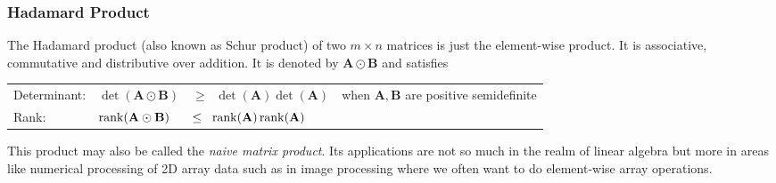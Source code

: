 






\subsubsection{Hadamard Product} The Hadamard product (also known as Schur product) of two $m \times n$ matrices is just the element-wise product. It is associative, commutative and distributive over addition. It is denoted by $\mathbf{A} \odot \mathbf{B}$ and satisfies

\medskip
\begin{tabular}{l l l l}
Determinant: & $\det(\mathbf{A} \odot \mathbf{B})$ 
             & $\geq \;\; \det(\mathbf{A})  \det(\mathbf{A})$   
             & when $\mathbf{A,B}$ are positive semidefinite \\
Rank:        & $\operatorname{rank}(\mathbf{A} \odot \mathbf{B}) $
             & $\leq \;\; \operatorname{rank}(\mathbf{A}) \operatorname{rank}(\mathbf{A})$     \\
\end{tabular}
\medskip

This product may also be called the \emph{naive matrix product}. Its applications are not so much in the realm of linear algebra but more in areas like numerical processing of 2D array data such as in image processing where we often want to do element-wise array operations. 

